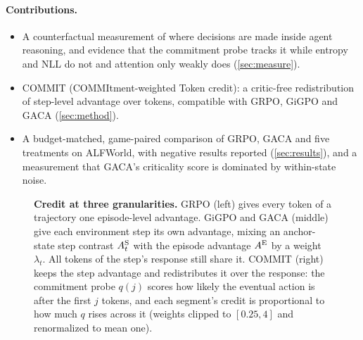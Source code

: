 \paragraph{Contributions.}
\begin{itemize}\itemsep0pt
\item A counterfactual measurement of where decisions are made inside agent reasoning, and evidence
  that the commitment probe tracks it while entropy and NLL do not and attention only weakly
  does (\cref{sec:measure}).
\item COMMIT (COMMItment-weighted Token credit): a critic-free redistribution of step-level advantage over tokens,
  compatible with GRPO, GiGPO and GACA (\cref{sec:method}).
\item A budget-matched, game-paired comparison of GRPO, GACA and five treatments on ALFWorld, with
  negative results reported (\cref{sec:results}), and a measurement that GACA's criticality score is
  dominated by within-state noise.
\end{itemize}

\begin{figure}[t]
\centering
\resizebox{\textwidth}{!}{}
\caption{\textbf{Credit at three granularities.} GRPO (left) gives every token of a trajectory one
episode-level advantage. GiGPO and GACA (middle) give each environment step its own advantage, mixing
an anchor-state step contrast $A^{\mathrm{S}}_t$ with the episode advantage $A^{\mathrm{E}}$ by a weight $\lambda_t$. All
tokens of the step's response still share it. COMMIT (right) keeps the step advantage
and redistributes it over the response: the commitment probe $q(j)$ scores how likely the eventual
action is after the first $j$ tokens, and each segment's credit is proportional to how much $q$ rises
across it (weights clipped to $[0.25, 4]$ and renormalized to mean one).}
\label{fig:method}
\end{figure}
